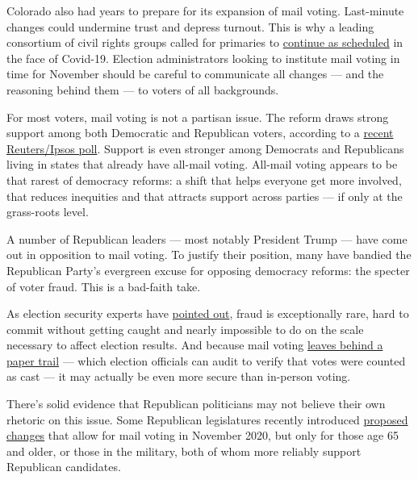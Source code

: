 Colorado also had years to prepare for its expansion of mail voting.
Last-minute changes could undermine trust and depress turnout. This is
why a leading consortium of civil rights groups called for primaries to
\href{https://civilrights.org/2020/03/13/voting-rights-groups-elections-must-proceed-while-states-protect-public-health/}{continue
as scheduled} in the face of Covid-19. Election administrators looking
to institute mail voting in time for November should be careful to
communicate all changes --- and the reasoning behind them --- to voters
of all backgrounds.

For most voters, mail voting is not a partisan issue. The reform draws
strong support among both Democratic and Republican voters, according to
a
\href{https://www.reuters.com/article/us-usa-election-poll/most-americans-unlike-trump-want-mail-in-ballots-for-november-if-coronavirus-threatens-reuters-ipsos-poll-idUSKBN21P3G0}{recent
Reuters/Ipsos poll}. Support is even stronger among Democrats and
Republicans living in states that already have all-mail voting. All-mail
voting appears to be that rarest of democracy reforms: a shift that
helps everyone get more involved, that reduces inequities and that
attracts support across parties --- if only at the grass-roots level.

A number of Republican leaders --- most notably President Trump --- have
come out in opposition to mail voting. To justify their position, many
have bandied the Republican Party's evergreen excuse for opposing
democracy reforms: the specter of voter fraud. This is a bad-faith take.

As election security experts have
\href{https://www.nytimes.com/article/mail-in-voting-explained.html}{pointed
out}, fraud is exceptionally rare, hard to commit without getting caught
and nearly impossible to do on the scale necessary to affect election
results. And because mail voting
\href{https://www.washingtonpost.com/news/powerpost/paloma/the-cybersecurity-202/2018/05/10/the-cybersecurity-202-how-colorado-became-the-safest-state-to-cast-a-vote/5af317c930fb042db5797427/}{leaves
behind a paper trail} --- which election officials can audit to verify
that votes were counted as cast --- it may actually be even more secure
than in-person voting.

There's solid evidence that Republican politicians may not believe their
own rhetoric on this issue. Some Republican legislatures recently
introduced
\href{https://nymag.com/intelligencer/2020/04/seven-states-limit-voting-by-mail-to-trump-approved-groups.html}{proposed
changes} that allow for mail voting in November 2020, but only for those
age 65 and older, or those in the military, both of whom more reliably
support Republican candidates.

